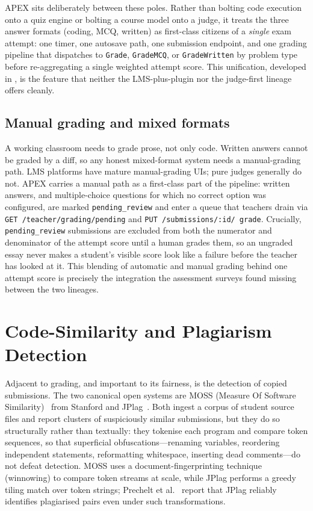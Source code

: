 APEX sits deliberately between these poles. Rather than bolting code execution onto a
quiz engine or bolting a course model onto a judge, it treats the three answer formats
(coding, MCQ, written) as first-class citizens of a \emph{single} exam attempt: one timer,
one autosave path, one submission endpoint, and one grading pipeline that dispatches to
\texttt{Grade}, \texttt{GradeMCQ}, or \texttt{GradeWritten} by problem type before
re-aggregating a single weighted attempt score. This unification, developed in
, is the feature that neither the LMS-plus-plugin nor the judge-first
lineage offers cleanly.

\subsection{Manual grading and mixed formats}

A working classroom needs to grade prose, not only code. Written answers cannot be graded
by a diff, so any honest mixed-format system needs a manual-grading path. LMS platforms
have mature manual-grading UIs; pure judges generally do not. APEX carries a manual path as
a first-class part of the pipeline: written answers, and multiple-choice questions for which
no correct option was configured, are marked \texttt{pending\_review} and enter a queue that
teachers drain via \texttt{GET /teacher/grading/pending} and \texttt{PUT /submissions/:id/%
grade}. Crucially, \texttt{pending\_review} submissions are excluded from both the numerator
and denominator of the attempt score until a human grades them, so an ungraded essay never
makes a student's visible score look like a failure before the teacher has looked at it.
This blending of automatic and manual grading behind one attempt score is precisely the
integration the assessment surveys found missing between the two lineages.

\section{Code-Similarity and Plagiarism Detection}\label{sec:bg-plagiarism}

Adjacent to grading, and important to its fairness, is the detection of copied
submissions. The two canonical open systems are MOSS (Measure Of Software Similarity)~%
\cite{moss} from Stanford and JPlag~\cite{prechelt2002jplag}. Both ingest a corpus of
student source files and report clusters of suspiciously similar submissions, but they do
so structurally rather than textually: they tokenise each program and compare token
sequences, so that superficial obfuscations---renaming variables, reordering independent
statements, reformatting whitespace, inserting dead comments---do not defeat detection.
MOSS uses a document-fingerprinting technique (winnowing) to compare token streams at scale,
while JPlag performs a greedy tiling match over token strings; Prechelt et
al.~\cite{prechelt2002jplag} report that JPlag reliably identifies plagiarised pairs even
under such transformations.

